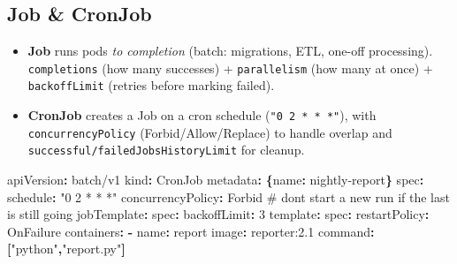\documentclass[11pt]{article}
\providecommand{\tightlist}{\setlength{\itemsep}{1pt}\setlength{\parskip}{0pt}}
\newenvironment{Shaded}{\begin{snugshade}}{\end{snugshade}}
\newcommand{\AttributeTok}[1]{\textcolor[rgb]{0.16,0.50,0.73}{#1}}
\newcommand{\CommentTok}[1]{\textcolor[rgb]{0.48,0.49,0.49}{#1}}
\newcommand{\DecValTok}[1]{\textcolor[rgb]{0.96,0.45,0.00}{#1}}
\newcommand{\FunctionTok}[1]{\textcolor[rgb]{0.56,0.27,0.68}{#1}}
\newcommand{\KeywordTok}[1]{\textcolor[rgb]{0.81,0.81,0.76}{\textbf{#1}}}
\newcommand{\StringTok}[1]{\textcolor[rgb]{0.96,0.31,0.31}{#1}}
\begin{document}
\subsection{Job \& CronJob}\label{job--cronjob}

\begin{itemize}
\tightlist
\item
  \textbf{Job} runs pods \emph{to completion} (batch: migrations, ETL, one-off processing). \texttt{completions} (how many successes) + \texttt{parallelism} (how many at once) + \texttt{backoffLimit} (retries before marking failed).
\item
  \textbf{CronJob} creates a Job on a cron schedule (\texttt{"0\ 2\ *\ *\ *"}), with \texttt{concurrencyPolicy} (Forbid/Allow/Replace) to handle overlap and \texttt{successful/failedJobsHistoryLimit} for cleanup.
\end{itemize}


\begin{Shaded}
\begin{Highlighting}[]
\FunctionTok{apiVersion}\KeywordTok{:}\AttributeTok{ batch/v1}
\FunctionTok{kind}\KeywordTok{:}\AttributeTok{ CronJob}
\FunctionTok{metadata}\KeywordTok{:}\AttributeTok{ }\KeywordTok{\{}\FunctionTok{name}\KeywordTok{:}\AttributeTok{ nightly{-}report}\KeywordTok{\}}
\FunctionTok{spec}\KeywordTok{:}
\AttributeTok{  }\FunctionTok{schedule}\KeywordTok{:}\AttributeTok{ }\StringTok{"0 2 * * *"}
\AttributeTok{  }\FunctionTok{concurrencyPolicy}\KeywordTok{:}\AttributeTok{ Forbid}\CommentTok{       \# don\textquotesingle{}t start a new run if the last is still going}
\AttributeTok{  }\FunctionTok{jobTemplate}\KeywordTok{:}
\AttributeTok{    }\FunctionTok{spec}\KeywordTok{:}
\AttributeTok{      }\FunctionTok{backoffLimit}\KeywordTok{:}\AttributeTok{ }\DecValTok{3}
\AttributeTok{      }\FunctionTok{template}\KeywordTok{:}
\AttributeTok{        }\FunctionTok{spec}\KeywordTok{:}
\AttributeTok{          }\FunctionTok{restartPolicy}\KeywordTok{:}\AttributeTok{ OnFailure}
\AttributeTok{          }\FunctionTok{containers}\KeywordTok{:}
\AttributeTok{            }\KeywordTok{{-}}\AttributeTok{ }\FunctionTok{name}\KeywordTok{:}\AttributeTok{ report}
\AttributeTok{              }\FunctionTok{image}\KeywordTok{:}\AttributeTok{ reporter:2.1}
\AttributeTok{              }\FunctionTok{command}\KeywordTok{:}\AttributeTok{ }\KeywordTok{[}\StringTok{"python"}\KeywordTok{,}\StringTok{"report.py"}\KeywordTok{]}
\end{Highlighting}
\end{Shaded}
\end{document}
